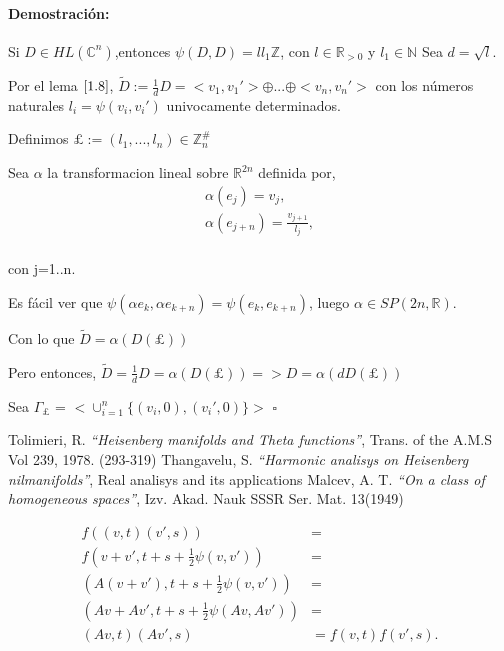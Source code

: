 \documentclass[12pt]{article}
\newenvironment{proof}{\paragraph{Demostración:}}{\hfill$\square$}
\begin{document}
\begin{proof}
 Si $D \in HL(\mathbb{C}^n)$,entonces $ \psi(D,D)=l l_1 \mathbb{Z}$, con $l \in \mathbb{R}_{>0}$ y $l_1 \in \mathbb{N}$
 Sea $d=\sqrt{l}$. 
 
 Por el lema $\ref{1.8}$, $\tilde{D}:= \frac{1}{d} D =  <v_1,v_1'> \oplus...\oplus <v_n,v_n'>$
 con los números naturales $l_i=\psi(v_i,v_i')$ univocamente determinados.

 Definimos $\pounds:=(l_1,...,l_n) \in \mathbb{Z}_n^{\#}$
 
  
 
 Sea $\alpha$ la transformacion lineal sobre $\mathbb{R}^{2n}$ definida por, 
 $$
 \begin{aligned}
 \alpha(e_j)=v_j,\\
 \alpha(e_{j+n})=\frac{v_{j+1}}{l_j},\\
 \end{aligned}$$
 
 con j=1..n.
 
 
Es fácil ver que $\psi(\alpha e_k,\alpha e_{k+n})=\psi(e_k,e_{k+n})$, luego $\alpha \in  SP(2n,\mathbb{R})$.

Con lo que $\tilde{D} = \alpha(D(\pounds)) $

Pero entonces, $\tilde{D}=\frac{1}{d} D = \alpha(D(\pounds)) => D=\alpha(d D(\pounds))$


Sea $\Gamma_{\pounds}$ = $<\cup_{i=1}^n \{(v_i,0),(v_i',0)\}>$
\end{proof}






 \newpage
  \begin{thebibliography}{1}
   Tolimieri, R.   \emph{``Heisenberg manifolds and Theta functions''}, Trans. of the A.M.S Vol 239, 1978. (293-319)
   Thangavelu, S.  \emph{``Harmonic analisys on Heisenberg nilmanifolds''}, Real analisys and its applications
   Malcev, A. T.  \emph{``On a class of homogeneous spaces''}, Izv. Akad. Nauk SSSR Ser. Mat. 13(1949)
  
  \end{thebibliography}

$$\begin{aligned}
f((v,t) (v',s))&=\\
f(v+v',t+s+ \frac{1}{2} \psi(v,v'))&=\\
(A(v+v'),t+s+ \frac{1}{2} \psi(v,v'))&=\\
(Av+Av',t+s+ \frac{1}{2} \psi(Av,Av'))&=\\
(Av,t)(Av',s)&=f(v,t) f(v',s).\\
\end{aligned}$$
\end{document}
